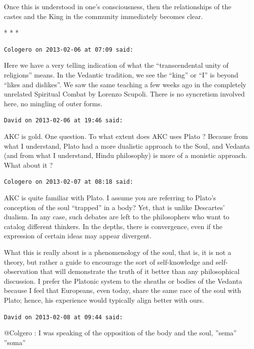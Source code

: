 Once this is understood in one's consciousness, then the relationships of the castes and the King in the community immediately becomes clear.



\begin{center}* * *\end{center}

\begin{footnotesize}
\begin{sffamily}
\texttt{Cologero on 2013-02-06 at 07:09 said:}

Here we have a very telling indication of what the ``transcendental unity of religions'' means. In the Vedantic tradition, we see the ``king'' or ``I'' is beyond ``likes and dislikes''. We saw the same teaching a few weeks ago in the completely unrelated Spiritual Combat by Lorenzo Scupoli. There is no syncretism involved here, no mingling of outer forms.

\hfill

\texttt{David on 2013-02-06 at 19:46 said:}

AKC is gold. One question. To what extent does AKC uses Plato ? Because from what I understand, Plato had a more dualistic approach to the Soul, and Vedanta (and from what I understand, Hindu philosophy) is more of a monistic approach. What about it ?

\hfill

\texttt{Cologero on 2013-02-07 at 08:18 said:}

AKC is quite familiar with Plato. I assume you are referring to Plato's conception of the soul ``trapped'' in a body? Yet, that is unlike Descartes' dualism. In any case, such debates are left to the philosophers who want to catalog different thinkers. In the depths, there is convergence, even if the expression of certain ideas may appear divergent.

What this is really about is a phenomenology of the soul, that is, it is not a theory, but rather a guide to encourage the sort of self-knowledge and self-observation that will demonstrate the truth of it better than any philosophical discussion. I prefer the Platonic system to the sheaths or bodies of the Vedanta because I feel that Europeans, even today, share the same race of the soul with Plato; hence, his experience would typically align better with ours.

\hfill

\texttt{David on 2013-02-08 at 09:44 said:}

@Colgero : I was speaking of the opposition of the body and the soul, ''sema'' ''soma''


\hfill

\end{sffamily}
\end{footnotesize}

